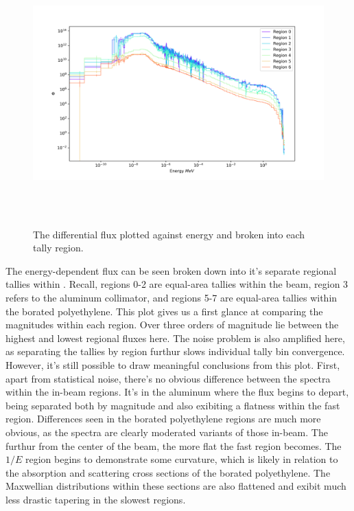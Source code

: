 %
\begin{figure}[htb]
\centering
\includegraphics[height=4in]{tex/figures/flux_rad_erg.png}
\caption[Regional Flux vs. Energy]{The differential flux plotted against energy and broken into each tally region.}
\label{fig:flux_rad_erg}
\end{figure}

The energy-dependent flux can be seen broken down into it's separate regional tallies within .
Recall, regions 0-2 are equal-area tallies within the beam, region 3 refers to the aluminum collimator, and regions 5-7 are equal-area tallies within the borated polyethylene.
This plot gives us a first glance at comparing the magnitudes within each region.
Over three orders of magnitude lie between the highest and lowest regional fluxes here.
The noise problem  is also amplified here, as separating the tallies by region furthur slows individual tally bin convergence.
However, it's still possible to draw meaningful conclusions from this plot.
First, apart from statistical noise, there's no obvious difference between the spectra within the in-beam regions.
It's in the aluminum where the flux begins to depart, being separated both by magnitude and also exibiting a flatness within the fast region.
Differences seen in the borated polyethylene regions are much more obvious, as the spectra are clearly moderated variants of those in-beam.
The furthur from the center of the beam, the more flat the fast region becomes.
The $1/E$ region begins to demonstrate some curvature, which is likely in relation to the absorption and scattering cross sections of the borated polyethylene.
The Maxwellian distributions within these sections are also flattened and exibit much less drastic tapering in the slowest regions.

